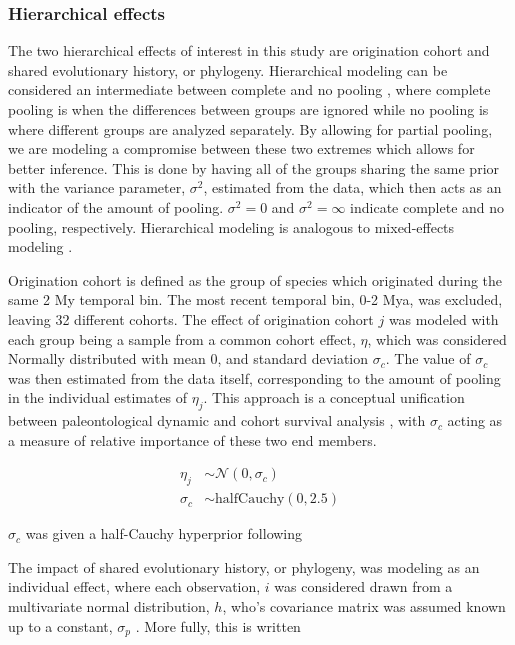 \documentclass[12pt,letterpaper]{article}
\begin{document}
\subsubsection{Hierarchical effects}

The two hierarchical effects of interest in this study are origination cohort and shared evolutionary history, or phylogeny. Hierarchical modeling can be considered an intermediate between complete and no pooling \citep{Gelman2007}, where complete pooling is when the differences between groups are ignored while no pooling is where different groups are analyzed separately. By allowing for partial pooling, we are modeling a compromise between these two extremes which allows for better inference. This is done by having all of the groups sharing the same prior with the variance parameter, \(\sigma^{2}\), estimated from the data, which then acts as an indicator of the amount of pooling. \(\sigma^{2} = 0\) and \(\sigma^{2} = \infty\) indicate complete and no pooling, respectively. Hierarchical modeling is analogous to mixed-effects modeling \citep{Gelman2007}. 

Origination cohort is defined as the group of species which originated during the same 2 My temporal bin. The most recent temporal bin, 0-2 Mya, was excluded, leaving 32 different cohorts. The effect of origination cohort \(j\) was modeled with each group being a sample from a common cohort effect, \(\eta\), which was considered Normally distributed with mean 0, and standard deviation \(\sigma_{c}\). The value of \(\sigma_{c}\) was then estimated from the data itself, corresponding to the amount of pooling in the individual estimates of \(\eta_{j}\). This approach is a conceptual unification between paleontological dynamic and cohort survival analysis \citep{Foote1988,Raup1978,Raup1975,VanValen1979,Baumiller1993}, with \(\sigma_{c}\) acting as a measure of relative importance of these two end members.

\begin{align*}
  \eta_{j} &\sim \mathcal{N}(0, \sigma_{c}) \\
  \sigma_{c} &\sim \mathrm{halfCauchy}(0, 2.5)
\end{align*}

\(\sigma_{c}\) was given a half-Cauchy hyperprior following \citet{Gelman2006a}

The impact of shared evolutionary history, or phylogeny, was modeling as an individual effect, where each observation, \(i\) was considered drawn from a multivariate normal distribution, \(h\), who's covariance matrix was assumed known up to a constant, \(\sigma_{p}\) \citep{Lynch1991,Housworth2004}. More fully, this is written
\end{document}
